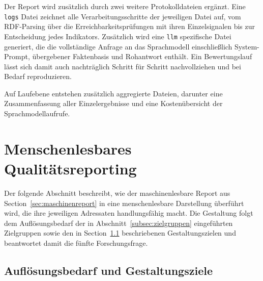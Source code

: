 Der Report wird zusätzlich durch zwei weitere Protokolldateien ergänzt.
Eine \texttt{logs} Datei zeichnet alle Verarbeitungsschritte der jeweiligen Datei auf, vom RDF-Parsing über die Erreichbarkeitsprüfungen mit ihren Einzelsignalen bis zur Entscheidung jedes Indikators. Zusätzlich wird eine \texttt{llm} spezifische Datei generiert, die die vollständige Anfrage an das Sprachmodell einschließlich System-Prompt, übergebener Faktenbasis und Rohantwort enthält. Ein Bewertungslauf lässt sich damit auch nachträglich Schritt für Schritt nachvollziehen und bei Bedarf reproduzieren.

Auf Laufebene entstehen zusätzlich aggregierte Dateien, darunter eine Zusammenfassung aller Einzelergebnisse und eine Kostenübersicht der Sprachmodellaufrufe.
\section{Menschenlesbares Qualitätsreporting}
\label{sec:frontend}

Der folgende Abschnitt beschreibt, wie der maschinenlesbare Report aus Section~\ref{sec:maschinenreport} in eine menschenlesbare Darstellung überführt wird, die ihre jeweiligen Adressaten handlungsfähig macht. Die Gestaltung folgt dem Auflösungsbedarf der in Abschnitt~\ref{subsec:zielgruppen} eingeführten Zielgruppen sowie den in Section~\ref{subsec:zielgruppen_frontend} beschriebenen Gestaltungszielen und beantwortet damit die fünfte Forschungsfrage.

\subsection{Auflösungsbedarf und Gestaltungsziele}
\label{subsec:zielgruppen_frontend}

